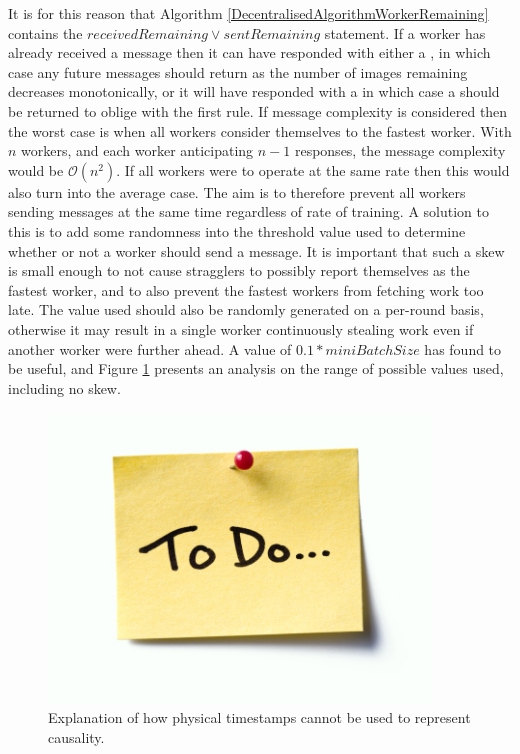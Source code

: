 \documentclass[12pt]{article}
\begin{document}
It is for this reason that Algorithm \ref{DecentralisedAlgorithmWorkerRemaining} contains the $receivedRemaining \lor sentRemaining$ statement. If a worker has already received a  message then it can have responded with either a , in which case any future messages should return  as the number of images remaining decreases monotonically, or it will have responded with a  in which case a  should be returned to oblige with the first rule.
\newline
If message complexity is considered then the worst case is when all workers consider themselves to the fastest worker. With $n$ workers, and each worker anticipating $n-1$ responses, the message complexity would be $\mathcal{O}(n^2)$. If all workers were to operate at the same rate then this would also turn into the average case.
\newline
The aim is to therefore prevent all workers sending  messages at the same time regardless of rate of training. A solution to this is to add some randomness into the threshold value used to determine whether or not a worker should send a  message. It is important that such a skew is small enough to not cause stragglers to possibly report themselves as the fastest worker, and to also prevent the fastest workers from fetching work too late. The value used should also be randomly generated on a per-round basis, otherwise it may result in a single worker continuously stealing work even if another worker were further ahead.
\newline
A value of $0.1*miniBatchSize$ has found to be useful, and Figure \ref{skewValue} presents an analysis on the range of possible values used, including no skew.

\begin{figure}[H]
  \centering
  \includegraphics[width=4in]{todo}
  \caption[]{Explanation of how physical timestamps cannot be used to represent causality.}
  \label{skewValue}
\end{figure}
\end{document}
